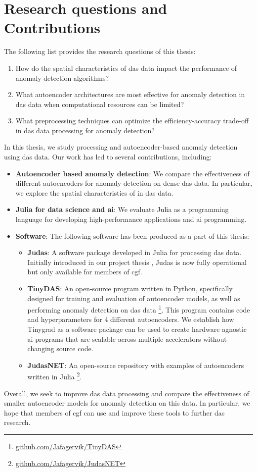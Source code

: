 \section{Research questions and Contributions}

The following list provides the research questions of this thesis: 

\begin{enumerate}
    \item How do the spatial characteristics of \acrshort{das} data impact the performance of anomaly detection algorithms?
    \item What autoencoder architectures are most effective for anomaly detection in \acrshort{das} data when computational resources can be limited?
    \item What preprocessing techniques can optimize the efficiency-accuracy trade-off in \acrshort{das} data processing for anomaly detection?
\end{enumerate}

In this thesis, we study processing and autoencoder-based anomaly detection using \acrshort{das} data. Our work has led to several contributions, including:

\begin{itemize}
    \item \textbf{Autoencoder based anomaly detection}: We compare the effectiveness of different autoencoders for anomaly detection on dense \acrshort{das} data. In particular, we explore the spatial characteristics of in \acrshort{das} data.
    \item \textbf{Julia for data science and \acrshort{ai}}: We evaluate Julia as a programming language for developing high-performance applications and \acrshort{ai} programming.
    \item \textbf{Software}: The following software has been produced as a part of this thesis:
    \begin{itemize}
        \item \textbf{Judas}: A software package developed in Julia for processing \acrshort{das} data. Initially introduced in our project thesis \cite{projthesis}, Judas is now fully operational but only available for members of \acrshort{cgf}. 
        \item \textbf{TinyDAS}: An open-source program written in Python, specifically designed for training and evaluation of autoencoder models, as well as performing anomaly detection on \acrshort{das} data \footnote{\url{github.com/Jafagervik/TinyDAS}}. This program contains code and hyperparameters for 4 different autoencoders.  We establish how Tinygrad \cite{tinygrad} as a software package can be used to create hardware agnostic \acrshort{ai} programs that are scalable across multiple accelerators without changing source code. 
        \item \textbf{JudasNET}: An open-source repository with examples of autoencoders written in Julia \footnote{\url{github.com/Jafagervik/JudasNET}}.
    \end{itemize}
\end{itemize}

Overall, we seek to improve \acrshort{das} data processing and compare the effectiveness of smaller autoencoder models for anomaly detection on this data. In particular, we hope that members of \acrshort{cgf} can use and improve these tools to further \acrshort{das} research.